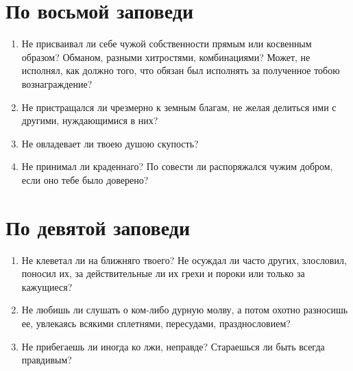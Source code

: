 \section{По восьмой заповеди}\nopagebreak

\begin{mymulticols}

\begin{enumerate}

\item Не присваивал ли себе чужой собственности прямым или косвенным образом? Обманом, разными хитростями, комбинациями? Может, не исполнял, как должно того, что обязан был исполнять за полученное тобою вознаграждение?

\item Не пристращался ли чрезмерно к земным благам, не желая делиться ими с другими, нуждающимися в них?

\item Не овладевает ли твоею душою скупость?

\item Не принимал ли краденнаго? По совести ли распоряжался чужим добром, если оно тебе было доверено? 

\end{enumerate}

\end{mymulticols}

\section{По девятой заповеди}\nopagebreak

\begin{mymulticols}

\begin{enumerate}

\item Не клеветал ли на ближняго твоего? Не осуждал ли часто других, злословил, поносил их, за действительные ли их грехи и пороки или только за кажущиеся?

\item Не любишь ли слушать о ком-либо дурную молву, а потом охотно разносишь ее, увлекаясь всякими сплетнями, пересудами, празднословием?

\item Не прибегаешь ли иногда ко лжи, неправде? Стараешься ли быть всегда правдивым? 
\end{enumerate}

\end{mymulticols}


